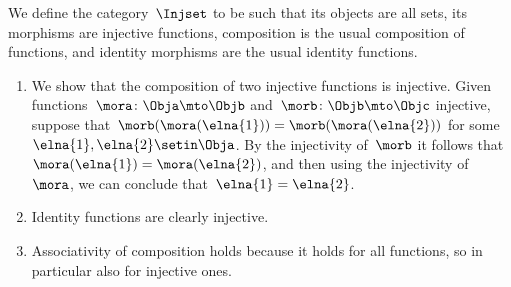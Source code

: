 \begin{solution}
    We define the category~$\Injset$ to be such that its objects are all sets, its morphisms are injective functions, composition is the usual composition of functions, and identity morphisms are the usual identity functions.
    \begin{enumerate}
        \item We show that the composition of two injective functions is injective.
              Given functions~$\mora \colon \Obja \mto \Objb$ and~$\morb \colon \Objb \mto \Objc$ injective, suppose that~$\morb(\mora (\elna{1})) = \morb(\mora (\elna{2}))$ for some~$\elna{1}, \elna{2} \setin \Obja$.
              By the injectivity of~$\morb$ it follows that~$\mora (\elna{1}) = \mora (\elna{2})$, and then using the injectivity of~$\mora$, we can conclude that~$\elna{1} = \elna{2}$.
        \item Identity functions are clearly injective.
        \item Associativity of composition holds because it holds for all functions, so in particular also for injective ones.
    \end{enumerate}
\end{solution}


